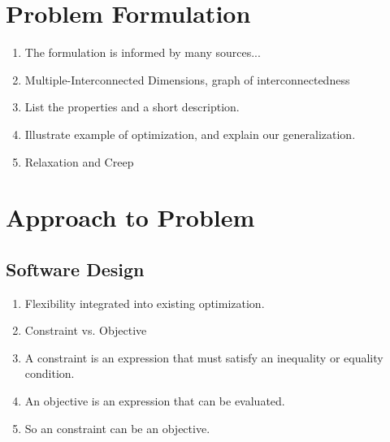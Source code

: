 \documentclass[11pt]{article}
\begin{document}
\section{Problem Formulation}

	\begin{enumerate}
	
		\item The formulation is informed by many sources... 
				
		\item Multiple-Interconnected Dimensions, graph of interconnectedness
	
		\item List the properties and a short description.

		

		\item Illustrate example of optimization, and explain our generalization.
		
		\item Relaxation and Creep
		
	\end{enumerate}
	
	
\section{Approach to Problem}

\subsection{Software Design}
	\begin{enumerate}
	
		
		
		\item Flexibility integrated into existing optimization.
				
		\item Constraint vs. Objective
	
		\item A constraint is an expression that must satisfy an inequality or equality condition.
		
		\item An objective is an expression that can be evaluated.
		
		\item So an constraint can be an objective. 
		
	\end{enumerate}
	
\end{document}
